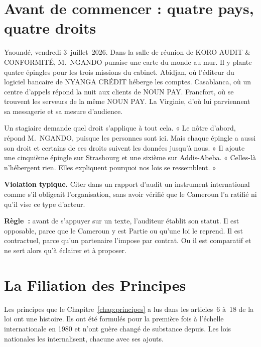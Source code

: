 \bigskip

\section*{Avant de commencer : quatre pays, quatre droits}

Yaoundé, vendredi 3~juillet~2026. Dans la salle de réunion de KORO AUDIT
\& CONFORMITÉ, M.~NGANDO punaise une carte du monde au mur. Il y plante
quatre épingles pour les trois missions du cabinet. Abidjan, où l'éditeur
du logiciel bancaire de NYANGA CRÉDIT héberge les comptes. Casablanca, où
un centre d'appels répond la nuit aux clients de NOUN PAY. Francfort, où se
trouvent les serveurs de la même NOUN PAY. La Virginie, d'où lui parviennent
sa messagerie et sa mesure d'audience.

Un stagiaire demande quel droit s'applique à tout cela. « Le nôtre d'abord,
répond M.~NGANDO, puisque les personnes sont ici. Mais chaque épingle a aussi
son droit et certains de ces droits suivent les données jusqu'à nous. » Il
ajoute une cinquième épingle sur Strasbourg et une sixième sur Addis-Abeba.
« Celles-là n'hébergent rien. Elles expliquent pourquoi nos lois se
ressemblent. »

\begin{boxalert}
\textbf{Violation typique.} Citer dans un rapport d'audit un instrument
international comme s'il obligeait l'organisation, sans avoir vérifié que le
Cameroun l'a ratifié ni qu'il vise ce type d'acteur.

\textbf{Règle~:} avant de s'appuyer sur un texte, l'auditeur établit son
statut. Il est opposable, parce que le Cameroun y est Partie ou qu'une loi
le reprend. Il est contractuel, parce qu'un partenaire l'impose par contrat.
Ou il est comparatif et ne sert alors qu'à éclairer et à proposer.
\end{boxalert}

\section{La Filiation des Principes}
\label{sec:c03-filiation}

Les principes que le Chapitre~\ref{chap:principes} a lus dans les
articles~6 à~18 de la loi ont une histoire. Ils ont été formulés pour la
première fois à l'échelle internationale en 1980 et n'ont guère changé de
substance depuis. Les lois nationales les internalisent, chacune avec ses
ajouts.

